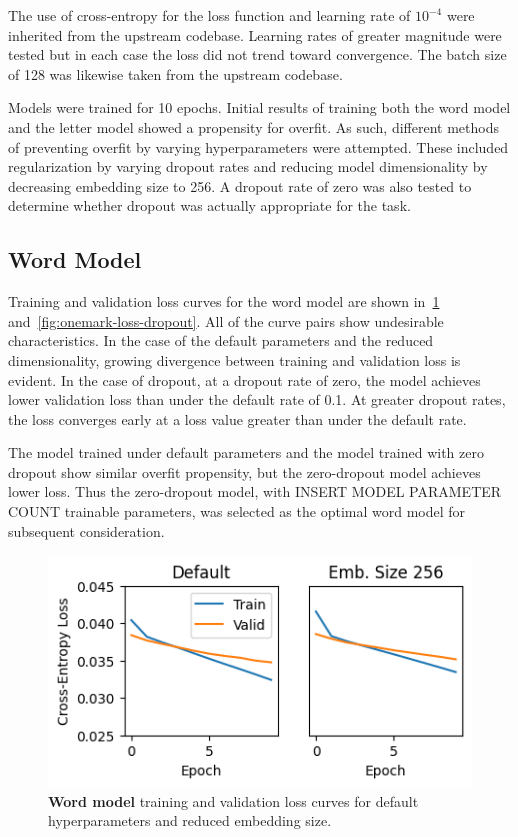 \documentclass[letterpaper]{article} %
\begin{document}
\begin{NoHyper}
The use of cross-entropy for the loss function and learning rate of $10^{-4}$ were inherited from the upstream codebase.
Learning rates of greater magnitude were tested but in each case the loss did not trend toward convergence.
The batch size of 128 was likewise taken from the upstream codebase.

Models were trained for 10 epochs.
Initial results of training both the word model and the letter model showed a propensity for overfit.
As such, different methods of preventing overfit by varying hyperparameters were attempted.
These included regularization by varying dropout rates and reducing model dimensionality by decreasing embedding size to 256.
A dropout rate of zero was also tested to determine whether dropout was actually appropriate for the task.

\subsection{Word Model}
\label{subsec:word}

Training and validation loss curves for the word model are shown in~\ref{fig:onemark-loss-df} and~\ref{fig:onemark-loss-dropout}.
All of the curve pairs show undesirable characteristics.
In the case of the default parameters and the reduced dimensionality, growing divergence between training and validation loss is evident.
In the case of dropout, at a dropout rate of zero, the model achieves lower validation loss than under the default rate of 0.1. At greater dropout rates, the loss converges  early at a loss value greater than under the default rate.

The model trained under default parameters and the model trained with zero dropout show similar overfit propensity, but the zero-dropout model achieves lower loss.
Thus the zero-dropout model, with INSERT MODEL PARAMETER COUNT trainable parameters, was selected as the optimal word model for subsequent consideration.

\begin{figure}
\centering
\includegraphics[width=0.9\columnwidth]{fig-onemark-loss-default-and-embsize}
\caption{\textbf{Word model} training and validation loss curves for default hyperparameters and reduced embedding size.}
\label{fig:onemark-loss-df}
\end{figure}


\end{NoHyper}
\end{document}
